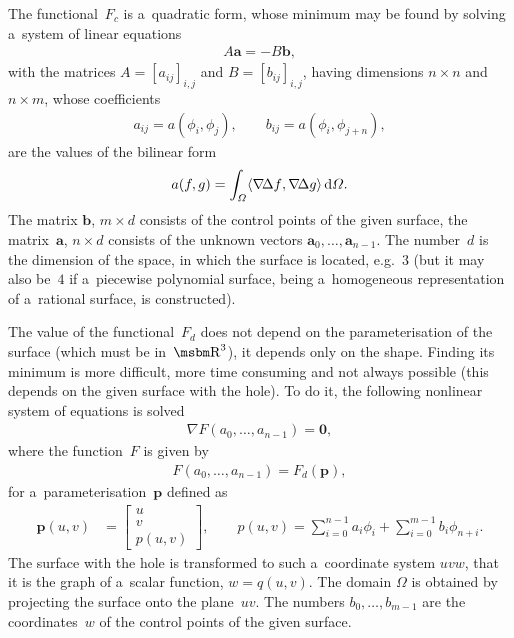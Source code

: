 The functional~$F_c$ is a~quadratic form, whose minimum may be found by solving
a~system of linear equations
\begin{align}\label{eq:g2h:Ritz:eq}
  A\bm{a}=-B\bm{b},
\end{align}
with the matrices $A=[a_{ij}]_{i,j}$ and $B=[b_{ij}]_{i,j}$,
having dimensions $n\times n$ and $n\times m$, whose coefficients
\begin{align*}
  a_{ij} = a(\phi_i,\phi_j), \qquad
  b_{ij} = a(\phi_i,\phi_{j+n}),
\end{align*}
are the values of the bilinear form
\begin{align*}
  a(f,g) = \int_{\varOmega}\scp{\nabla\!\Delta f}%
  {\nabla\!\Delta g}\,\mathrm{d}\varOmega.
\end{align*}
The matrix $\bm{b}$, $m\times d$ consists of the control points
of the given surface, the matrix~$\bm{a}$, $n\times d$ consists of the
unknown vectors $\bm{a}_0,\ldots,\bm{a}_{n-1}$. The number~$d$ is
the dimension of the space, in which the surface is located,
e.g.~$3$ (but it may also be~$4$ if a~piecewise polynomial surface,
being a~homogeneous representation of a~rational surface, is constructed).

The value of the functional~$F_d$ does not depend on the parameterisation
of the surface (which must be in~$\R^3$),
it depends only on the shape. Finding its minimum is more difficult, more
time consuming and not always possible (this depends on the given surface
with the hole). To do it, the following nonlinear system of equations is solved
\begin{align}
  \nabla F(a_0,\ldots,a_{n-1}) = \bm{0},
\end{align}
where the function~$F$ is given by
\begin{align*}
  F(a_0,\ldots,a_{n-1}) = F_d(\bm{p}),
\end{align*}
for a~parameterisation~$\bm{p}$ defined as
\begin{align*}
  \bm{p}(u,v) &{}= \left[\begin{array}{c} u \\ v \\ p(u,v) \end{array}\right],
\qquad
  p(u,v) = \sum_{i=0}^{n-1}a_i\phi_i+\sum_{i=0}^{m-1}b_i\phi_{n+i}.
\end{align*}
The surface with the hole is transformed to such a~coordinate system
$uvw$, that it is the graph of a~scalar function,
$w=q(u,v)$. The domain $\varOmega$ is obtained by projecting the surface
onto the plane~$uv$. The numbers $b_0,\ldots,b_{m-1}$ are the
coordinates~$w$ of the control points of the given surface.


